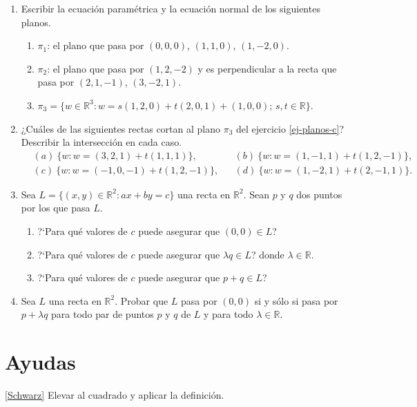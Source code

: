 \begin{enumerate}[resume,topsep=6pt, itemsep=.4cm]
\item\label{ej-planos} Escribir la ecuación paramétrica  y la ecuación normal de los siguientes planos.
\begin{enumerate}
    \item $\pi_1$: el plano que pasa por $(0,0,0)$, $(1,1,0)$, $(1,-2,0)$.
    \item $\pi_2$: el plano que pasa por $(1,2,-2)$ y es perpendicular a la
    recta que pasa por $(2,1,-1)$, $(3,-2,1)$.
    \item\label{ej-planos-c}  $\pi_3=\{w\in\mathbb{R}^3: w=s(1,2,0)+t(2,0,1)+(1,0,0);\,s,t\in \mathbb R\}$.
\end{enumerate}



\item ¿Cuáles de las siguientes rectas cortan al plano $\pi_3$ del  ejercicio  \ref{ej-planos-c}?
Describir la intersección en cada caso.
\begin{align*}
&(a) \ \{w: w=(3,2,1)+t(1,1,1)\}, && (b) \  \{w: w=(1,-1,1)+t(1,2,-1)\}, \\
&(c)\  \{w: w=(-1,0,-1)+t(1,2,-1)\}, && (d) \  \{w: w=(1,-2,1)+t(2,-1,1)\}.
\end{align*}


\item\label{rectas como subespacio} Sea $L=\{(x,y)\in\mathbb{R}^2 : ax+by=c\}$ una recta en $\mathbb{R}^2$. Sean $p$ y $q$ dos puntos por los que pasa $L$.
\begin{enumerate}
 \item ?`Para qué valores de $c$ puede asegurar que $(0,0)\in L$?
 \item ?`Para qué valores de $c$ puede asegurar que $\lambda q\in L$? donde $\lambda\in\mathbb{R}$.
 \item ?`Para qué valores de $c$ puede asegurar que $p+q\in L$?
\end{enumerate}


\item\label{rectas-por-el-0} Sea $L$ una recta en $\mathbb{R}^2$. Probar que $L$ pasa por $(0,0)$ si y sólo si pasa por $p+\lambda q$ para todo par de puntos $p$ y $q$ de $L$ y para todo $\lambda\in\mathbb{R}$.
\end{enumerate}


\section*{Ayudas}
 \ref{Schwarz} Elevar al cuadrado y aplicar la definición.

